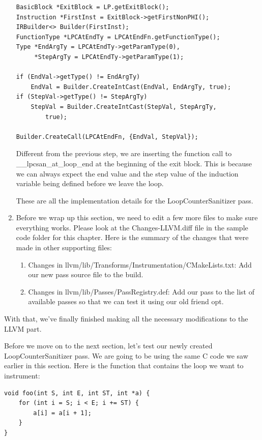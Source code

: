 \begin{enumerate}
\begin{lstlisting}[style=styleCXX]
BasicBlock *ExitBlock = LP.getExitBlock();
Instruction *FirstInst = ExitBlock->getFirstNonPHI();
IRBuilder<> Builder(FirstInst);
FunctionType *LPCAtEndTy = LPCAtEndFn.getFunctionType();
Type *EndArgTy = LPCAtEndTy->getParamType(0),
     *StepArgTy = LPCAtEndTy->getParamType(1);

if (EndVal->getType() != EndArgTy)
	EndVal = Builder.CreateIntCast(EndVal, EndArgTy, true);
if (StepVal->getType() != StepArgTy)
	StepVal = Builder.CreateIntCast(StepVal, StepArgTy,
		true);
		
Builder.CreateCall(LPCAtEndFn, {EndVal, StepVal});
\end{lstlisting}

Different from the previous step, we are inserting the function call to \_\_lpcsan\_at\_loop\_end at the beginning of the exit block. This is because we can always expect the end value and the step value of the induction variable being defined before we leave the loop.

These are all the implementation details for the LoopCounterSanitizer pass.

\item Before we wrap up this section, we need to edit a few more files to make sure everything works. Please look at the Changes-LLVM.diff file in the sample code folder for this chapter. Here is the summary of the changes that were made in other supporting files:

\begin{enumerate}[label=\roman*.]
\item Changes in llvm/lib/Transforms/Instrumentation/CMakeLists.txt: Add our new pass source file to the build.
\item Changes in llvm/lib/Passes/PassRegistry.def: Add our pass to the list of available passes so that we can test it using our old friend opt.
\end{enumerate}

\end{enumerate}

With that, we've finally finished making all the necessary modifications to the LLVM part.

Before we move on to the next section, let's test our newly created LoopCounterSanitizer pass. We are going to be using the same C code we saw earlier in this section. Here is the function that contains the loop we want to instrument:

\begin{lstlisting}[style=styleCXX]
void foo(int S, int E, int ST, int *a) {
	for (int i = S; i < E; i += ST) {
		a[i] = a[i + 1];
	}
}
\end{lstlisting}

